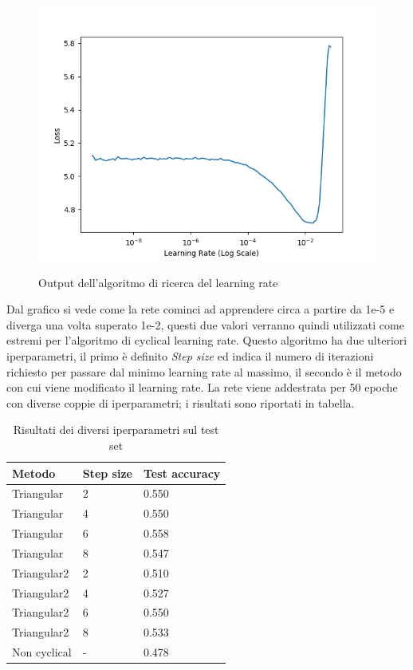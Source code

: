 \begin{figure}[ht]
\centering
\includegraphics[width=1.0\textwidth]{images/baseline/lrfind_plot.png} 
\label{i_baseline_finder}
\caption{Output dell'algoritmo di ricerca del learning rate}
\end{figure}
\newpage
Dal grafico si vede come la rete cominci ad apprendere circa a partire da 1e-5 e diverga una volta superato 1e-2, questi due valori verranno quindi utilizzati come estremi per l'algoritmo di cyclical learning rate.
Questo algoritmo ha due ulteriori iperparametri, il primo è definito \textit{Step size} ed indica il numero di iterazioni richiesto per passare dal minimo learning rate al massimo, il secondo è il metodo con cui viene modificato il learning rate.
La rete viene addestrata per 50 epoche con diverse coppie di iperparametri; i risultati sono riportati in tabella.
\begin{table}[H]
\centering
\caption{Risultati dei diversi iperparametri sul test set}
\begin{tabular}{|l|l|l|}
\hline
Metodo       & Step size & Test accuracy \\ \hline
Triangular   & 2         & 0.550         \\ \hline
Triangular   & 4         & 0.550         \\ \hline
Triangular   & 6         & 0.558         \\ \hline
Triangular   & 8         & 0.547         \\ \hline
Triangular2  & 2         & 0.510         \\ \hline
Triangular2  & 4         & 0.527         \\ \hline
Triangular2  & 6         & 0.550         \\ \hline
Triangular2  & 8         & 0.533         \\ \hline
Non cyclical & -         & 0.478         \\ \hline
\end{tabular}
\label{t_clr}
\end{table}
